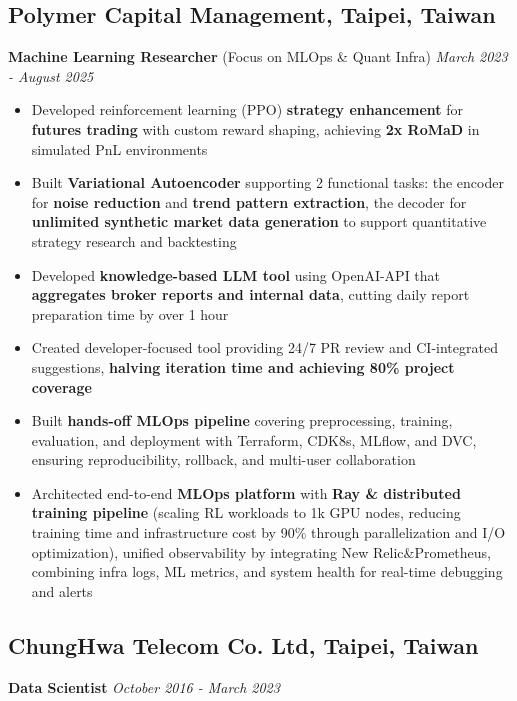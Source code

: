 \documentclass[a4paper,9pt]{extarticle}
\begin{document}
\subsection*{Polymer Capital Management, Taipei, Taiwan}
\textbf{Machine Learning Researcher} (Focus on MLOps \& Quant Infra) \hfill \textit{March 2023 - August 2025}

\begin{itemize}[leftmargin=1em,itemsep=0.15em,parsep=0pt]
    \item Developed reinforcement learning (PPO) \textbf{strategy enhancement} for \textbf{futures trading} with custom reward shaping, achieving \textbf{2x RoMaD} in simulated PnL environments
    \item Built \textbf{Variational Autoencoder} supporting 2 functional tasks: the encoder for \textbf{noise reduction} and \textbf{trend pattern extraction}, the decoder for \textbf{unlimited synthetic market data generation} to support quantitative strategy research and backtesting
    \item Developed \textbf{knowledge-based LLM tool} using OpenAI-API that \textbf{aggregates broker reports and internal data}, cutting daily report preparation time by over 1 hour
    \item Created developer-focused tool providing 24/7 PR review and CI-integrated suggestions, \textbf{halving iteration time and achieving 80\% project coverage}
    \item Built \textbf{hands-off MLOps pipeline} covering preprocessing, training, evaluation, and deployment with Terraform, CDK8s, MLflow, and DVC, ensuring reproducibility, rollback, and multi-user collaboration
    \item Architected end-to-end \textbf{MLOps platform} with \textbf{Ray \& distributed training pipeline} (scaling RL workloads to 1k GPU nodes, reducing training time and infrastructure cost by 90\% through parallelization and I/O optimization), unified observability by integrating New Relic\&Prometheus, combining infra logs, ML metrics, and system health for real-time debugging and alerts
\end{itemize}

\subsection*{ChungHwa Telecom Co. Ltd, Taipei, Taiwan}
\textbf{Data Scientist} \hfill \textit{October 2016 - March 2023}
\end{document}
